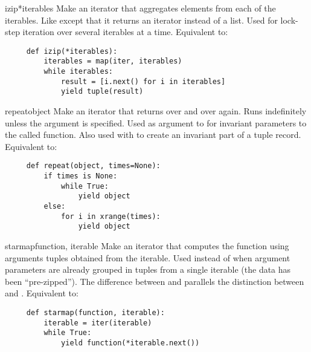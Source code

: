 \begin{funcdesc}{izip}{*iterables}
  Make an iterator that aggregates elements from each of the iterables.
  Like  except that it returns an iterator instead of
  a list.  Used for lock-step iteration over several iterables at a
  time.  Equivalent to:

  \begin{verbatim}
     def izip(*iterables):
         iterables = map(iter, iterables)
         while iterables:
             result = [i.next() for i in iterables]
             yield tuple(result)
  \end{verbatim}

\end{funcdesc}

\begin{funcdesc}{repeat}{object}
  Make an iterator that returns  over and over again.
  Runs indefinitely unless the  argument is specified.
  Used as argument to  for invariant parameters
  to the called function.  Also used with  to create
  an invariant part of a tuple record.  Equivalent to:

  \begin{verbatim}
     def repeat(object, times=None):
         if times is None:
             while True:
                 yield object
         else:
             for i in xrange(times):
                 yield object
  \end{verbatim}
\end{funcdesc}

\begin{funcdesc}{starmap}{function, iterable}
  Make an iterator that computes the function using arguments tuples
  obtained from the iterable.  Used instead of  when
  argument parameters are already grouped in tuples from a single iterable
  (the data has been ``pre-zipped'').  The difference between
   and  parallels the distinction
  between  and .
  Equivalent to:

  \begin{verbatim}
     def starmap(function, iterable):
         iterable = iter(iterable)
         while True:
             yield function(*iterable.next())
  \end{verbatim}
\end{funcdesc}

